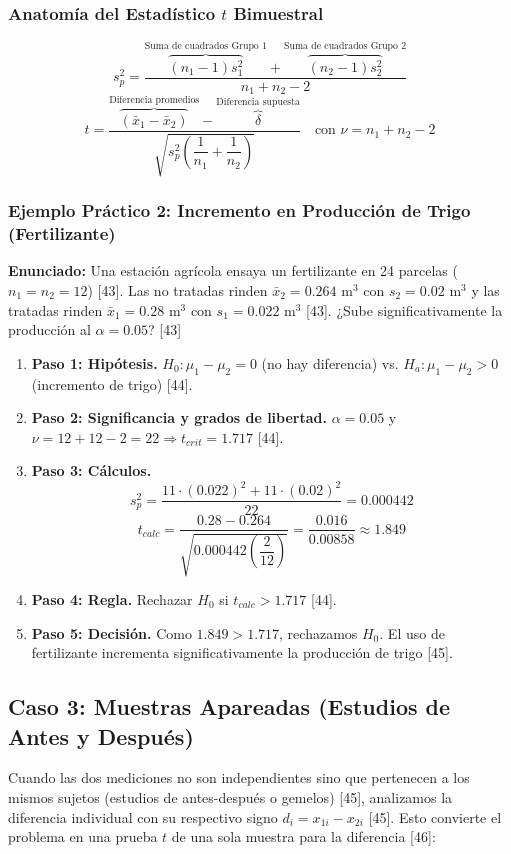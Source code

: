 \documentclass{article}
\begin{document}
\subsubsection*{Anatomía del Estadístico $t$ Bimuestral}
\[
s_p^2 = \frac{ \overbrace{(n_1 - 1)s_1^2}^{\text{Suma de cuadrados Grupo 1}} + \overbrace{(n_2 - 1)s_2^2}^{\text{Suma de cuadrados Grupo 2}} }{ n_1 + n_2 - 2 }
\]
\[
t = \frac{ \overbrace{(\bar{x}_1 - \bar{x}_2)}^{\text{Diferencia promedios}} - \overbrace{\delta}^{\text{Diferencia supuesta}} }{ \sqrt{s_p^2 \left(\dfrac{1}{n_1} + \dfrac{1}{n_2}\right)} } \quad \text{con } \nu = n_1 + n_2 - 2
\]

\subsubsection*{Ejemplo Práctico 2: Incremento en Producción de Trigo (Fertilizante)}
\textbf{Enunciado:} Una estación agrícola ensaya un fertilizante en 24 parcelas ($n_1=n_2=12$) [43]. Las no tratadas rinden $\bar{x}_2 = 0.264\text{ m}^3$ con $s_2 = 0.02\text{ m}^3$ y las tratadas rinden $\bar{x}_1 = 0.28\text{ m}^3$ con $s_1 = 0.022\text{ m}^3$ [43]. ¿Sube significativamente la producción al $\alpha = 0.05$? [43]

\begin{enumerate}
    \item \textbf{Paso 1: Hipótesis.} $H_0: \mu_1 - \mu_2 = 0$ (no hay diferencia) vs. $H_a: \mu_1 - \mu_2 > 0$ (incremento de trigo) [44].
    \item \textbf{Paso 2: Significancia y grados de libertad.} $\alpha = 0.05$ y $\nu = 12 + 12 - 2 = 22 \Rightarrow t_{crit} = 1.717$ [44].
    \item \textbf{Paso 3: Cálculos.}
    \[ s_p^2 = \frac{11 \cdot (0.022)^2 + 11 \cdot (0.02)^2}{22} = 0.000442 \]
    \[ t_{calc} = \frac{0.28 - 0.264}{\sqrt{0.000442 \left(\dfrac{2}{12}\right)}} = \frac{0.016}{0.00858} \approx 1.849 \]
    \item \textbf{Paso 4: Regla.} Rechazar $H_0$ si $t_{calc} > 1.717$ [44].
    \item \textbf{Paso 5: Decisión.} Como $1.849 > 1.717$, rechazamos $H_0$. El uso de fertilizante incrementa significativamente la producción de trigo [45].
\end{enumerate}

\subsection{Caso 3: Muestras Apareadas (Estudios de Antes y Después)}
Cuando las dos mediciones no son independientes sino que pertenecen a los mismos sujetos (estudios de antes-después o gemelos) [45], analizamos la diferencia individual con su respectivo signo $d_i = x_{1i} - x_{2i}$ [45]. Esto convierte el problema en una prueba $t$ de una sola muestra para la diferencia [46]:
\end{document}
